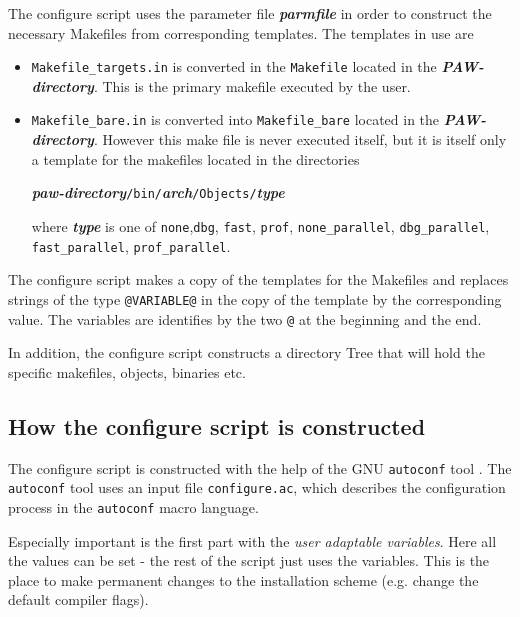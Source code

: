 \documentclass[a4paper,10pt]{report}
\newcommand{\myspec}[1]{\textbf{\textit{#1}}}
\newcommand{\mytt}[1]{{\tt #1}}
\begin{document}
The configure script uses the parameter file \myspec{parmfile} in
order to construct the necessary Makefiles from corresponding
templates. The templates in use are
\begin{itemize}
\item \mytt{Makefile\_targets.in} is converted in the \mytt{Makefile}
located in the \myspec{PAW-directory}. This is the primary makefile
executed by the user.
\item \mytt{Makefile\_bare.in} is converted into \mytt{Makefile\_bare}
located in the \myspec{PAW-directory}. However this make file is never
executed itself, but it is itself only a template for the makefiles located in the directories
\begin{center}
\myspec{paw-directory}\mytt{/bin/}\myspec{arch}\mytt{/Objects/}\myspec{type}
\end{center}
where \myspec{type} is one of \mytt{none},\mytt{dbg}, \mytt{fast},
\mytt{prof}, \mytt{none\_parallel}, \mytt{dbg\_parallel},
\mytt{fast\_parallel}, \mytt{prof\_parallel}.
\end{itemize}

The configure script makes a copy of the templates for the Makefiles
and replaces strings of the type \mytt{@VARIABLE@} in the copy of the
template by the corresponding value. The variables are identifies by
the two \mytt{@} at the beginning and the end.

In addition, the configure script constructs a directory Tree that will
hold the specific makefiles, objects, binaries etc.

\subsection{How the configure script is constructed}
\label{sec:constructconfigure}

The configure script is constructed with the help of the GNU
\mytt{autoconf} tool . The \mytt{autoconf} tool uses an input file
\mytt{configure.ac}, which describes the configuration process in the
\mytt{autoconf} macro language.

Especially important is the first part with the \emph{user adaptable
variables}. Here all the values can be set - the rest of the script just uses
the variables.  This is the place to make permanent changes to the installation
scheme (e.g. change the default compiler flags).
\end{document}
